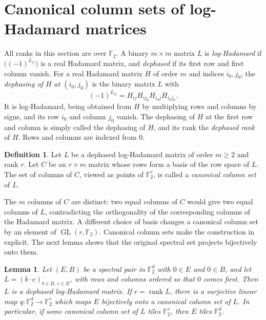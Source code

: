 \documentclass[11pt]{amsart}
\newtheorem{lemma}[theorem]{Lemma}
\theoremstyle{definition}
\newtheorem{definition}[theorem]{Definition}
\theoremstyle{remark}
\numberwithin{equation}{section}
\numberwithin{table}{section}
\newcommand{\F}{\mathbb{F}}
\newcommand{\rank}{\operatorname{rank}}
\newcommand{\GL}{\operatorname{GL}}
\begin{document}
\section{Canonical column sets of log-Hadamard matrices}\label{sec:hadamard}

All ranks in this section are over $\F_2$. A binary $m\times m$ matrix $L$ is \emph{log-Hadamard} if $\bigl((-1)^{L_{ij}}\bigr)$ is a real Hadamard matrix, and \emph{dephased} if its first row and first column vanish. For a real Hadamard matrix $H$ of order $m$ and indices $i_0,j_0$, the \emph{dephasing of $H$ at $(i_0,j_0)$} is the binary matrix $L$ with
\[
(-1)^{L_{ij}}=H_{ij}H_{ij_0}H_{i_0j}H_{i_0j_0}.
\]
It is log-Hadamard, being obtained from $H$ by multiplying rows and columns by signs, and its row $i_0$ and column $j_0$ vanish. The dephasing of $H$ at the first row and column is simply called the dephasing of $H$, and its rank the \emph{dephased rank} of $H$. Rows and columns are indexed from $0$.

\begin{definition}\label{def:canonical}
Let $L$ be a dephased log-Hadamard matrix of order $m\ge2$ and rank $r$. Let $C$ be an $r\times m$ matrix whose rows form a basis of the row space of $L$. The set of columns of $C$, viewed as points of $\F_2^r$, is called a \emph{canonical column set} of $L$.
\end{definition}

The $m$ columns of $C$ are distinct: two equal columns of $C$ would give two equal columns of $L$, contradicting the orthogonality of the corresponding columns of the Hadamard matrix. A different choice of basis changes a canonical column set by an element of $\GL(r,\F_2)$. Canonical column sets make the construction in \cite[Theorem~4.7]{AAB17} explicit. The next lemma shows that the original spectral set projects bijectively onto them.

\begin{lemma}\label{lem:canonical}
Let $(E,B)$ be a spectral pair in $\F_2^d$ with $0\in E$ and $0\in B$, and let $L=(b\cdot e)_{b\in B,\,e\in E}$, with rows and columns ordered so that $0$ comes first. Then $L$ is a dephased log-Hadamard matrix. If $r=\rank L$, there is a surjective linear map $q\colon\F_2^d\to\F_2^r$ which maps $E$ bijectively onto a canonical column set of $L$. In particular, if some canonical column set of $L$ tiles $\F_2^r$, then $E$ tiles $\F_2^d$.
\end{lemma}
\end{document}
